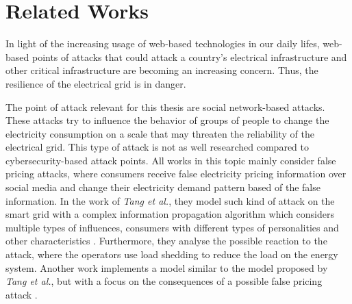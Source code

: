 \chapter{Related Works}
\label{relatedworks}
In light of the increasing usage of web-based technologies in our daily 
lifes, web-based points of attacks that could attack a country's 
electrical infrastructure and other critical infrastructure 
are becoming an increasing concern.
Thus, the resilience of the electrical grid is in danger.


The point of attack relevant for this thesis are social network-based
attacks. These attacks try to influence the behavior of groups of people to 
change the electricity consumption on a scale that may threaten the reliability
of the electrical grid. This type of attack is not as well researched 
compared to cybersecurity-based attack points. All works in this topic
mainly consider false pricing attacks, where consumers receive false 
electricity pricing information over social media and change their 
electricity demand pattern based of the false information.
In the work of \textit{Tang et al.}, they model such kind of attack on the 
smart grid with a complex information propagation algorithm which considers 
multiple types of influences, consumers with different types of 
personalities and other characteristics \cite{falsepricing1}.
Furthermore, they analyse the possible reaction to the attack, where
the operators use load shedding to reduce the load on the energy system. 
Another work implements a model similar to the model
proposed by \textit{Tang et al.}, but with a focus on the consequences of a 
possible false pricing attack \cite{vulnerabilityanalysis}.

